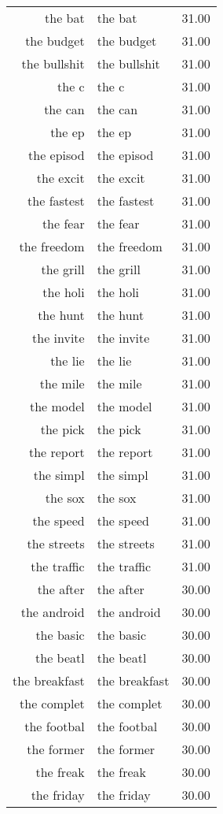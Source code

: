 \begin{table}[ht]
\begin{tabular}{rlr}
  the bat & the bat & 31.00 \\ 
  the budget & the budget & 31.00 \\ 
  the bullshit & the bullshit & 31.00 \\ 
  the c & the c & 31.00 \\ 
  the can & the can & 31.00 \\ 
  the ep & the ep & 31.00 \\ 
  the episod & the episod & 31.00 \\ 
  the excit & the excit & 31.00 \\ 
  the fastest & the fastest & 31.00 \\ 
  the fear & the fear & 31.00 \\ 
  the freedom & the freedom & 31.00 \\ 
  the grill & the grill & 31.00 \\ 
  the holi & the holi & 31.00 \\ 
  the hunt & the hunt & 31.00 \\ 
  the invite & the invite & 31.00 \\ 
  the lie & the lie & 31.00 \\ 
  the mile & the mile & 31.00 \\ 
  the model & the model & 31.00 \\ 
  the pick & the pick & 31.00 \\ 
  the report & the report & 31.00 \\ 
  the simpl & the simpl & 31.00 \\ 
  the sox & the sox & 31.00 \\ 
  the speed & the speed & 31.00 \\ 
  the streets & the streets & 31.00 \\ 
  the traffic & the traffic & 31.00 \\ 
  the after & the after & 30.00 \\ 
  the android & the android & 30.00 \\ 
  the basic & the basic & 30.00 \\ 
  the beatl & the beatl & 30.00 \\ 
  the breakfast & the breakfast & 30.00 \\ 
  the complet & the complet & 30.00 \\ 
  the footbal & the footbal & 30.00 \\ 
  the former & the former & 30.00 \\ 
  the freak & the freak & 30.00 \\ 
  the friday & the friday & 30.00 \\ 

\end{tabular}
\end{table}

